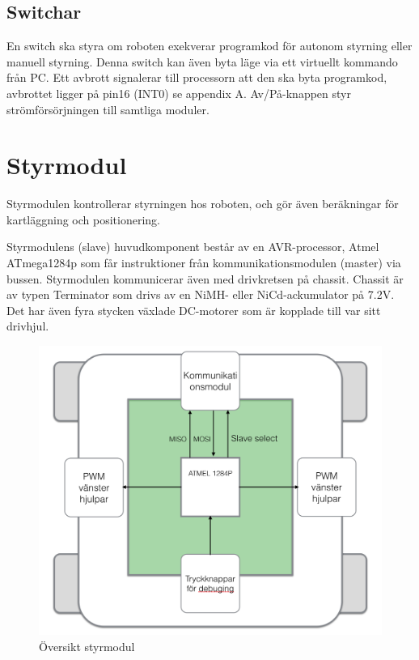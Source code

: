 \documentclass[a4paper,12pt,fleqn]{article}
\begin{document}
\subsection{Switchar}
En switch ska styra om roboten exekverar programkod för autonom styrning eller manuell styrning. Denna switch kan även byta läge via ett virtuellt kommando från PC. Ett avbrott signalerar till processorn att den ska byta programkod, avbrottet ligger på pin16 (INT0) se appendix A. Av/På-knappen styr strömförsörjningen till samtliga moduler. 


\newpage
\section{Styrmodul}
Styrmodulen kontrollerar styrningen hos roboten, och gör även beräkningar för kartläggning och positionering. 

Styrmodulens (slave) huvudkomponent består av en AVR-processor, Atmel ATmega1284p som får instruktioner från kommunikationsmodulen (master) via bussen. Styrmodulen kommunicerar även med drivkretsen på chassit. Chassit är av typen Terminator som drivs av en NiMH- eller NiCd-ackumulator på 7.2V. Det har även fyra stycken växlade DC-motorer som är kopplade till var sitt drivhjul. 

\begin{figure}[htp] %
  \begin{center}
  \includegraphics[keepaspectratio=true,width=\linewidth]{bilder/styrmodul}  %
  \end{center}
  \caption{Översikt styrmodul} %
  \label{fig:styr} %
\end{figure}
\newpage
\end{document}
